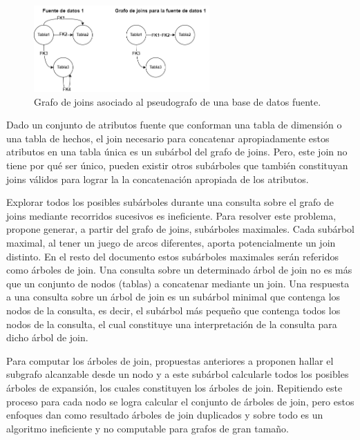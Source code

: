 \begin{figure}[H]
    \centering
    \includegraphics[width=0.60\textwidth]{Graphics/graph join transformation.drawio.png}
    \caption{Grafo de joins asociado al pseudografo de una base de datos fuente.}
    \label{fig:joingraphobtention}
\end{figure}

Dado un conjunto de atributos fuente que conforman una tabla de dimensión o una tabla de hechos, el join necesario 
para concatenar apropiadamente estos atributos en una tabla \'unica es un sub\'arbol del grafo de joins. Pero, este join no tiene 
por qu\'e ser \'unico, pueden existir otros sub\'arboles que también constituyan joins válidos para lograr 
la la concatenación apropiada de los atributos. 

Explorar todos los posibles sub\'arboles durante una consulta sobre el grafo de joins mediante 
recorridos sucesivos es ineficiente. Para resolver este problema, \cite{mason2005autojoin} propone 
generar, a partir del grafo de joins, sub\'arboles maximales. Cada sub\'arbol maximal, al tener un juego 
de arcos diferentes, aporta potencialmente un join distinto. En el resto del documento estos sub\'arboles 
maximales ser\'an referidos como \'arboles de join. Una consulta sobre un determinado \'arbol de join no es m\'as que 
un conjunto de nodos (tablas) a concatenar mediante un join. Una respuesta a una consulta sobre un \'arbol de join es un sub\'arbol 
minimal que contenga los nodos de la consulta, es decir, el subárbol m\'as pequeño que contenga todos los nodos 
de la consulta, el cual constituye una interpretación 
de la consulta para dicho \'arbol de join.

Para computar los \'arboles de join, propuestas anteriores a \cite{mason2005autojoin} proponen hallar 
el subgrafo alcanzable desde un nodo y a este sub\'arbol calcularle todos los posibles \'arboles de 
expansión, los cuales constituyen los \'arboles de join. Repitiendo este proceso para 
cada nodo se logra 
calcular el conjunto de \'arboles de join, 
pero estos enfoques dan como resultado \'arboles de join duplicados y sobre todo 
es un algoritmo ineficiente y no computable para grafos de gran tamaño\cite{mason2005autojoin}.

